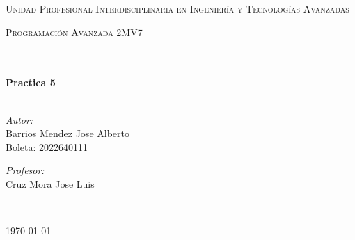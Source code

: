 \documentclass[11pt]{article}
\begin{document}
\begin{center}
\textsc{\LARGE Unidad Profesional Interdisciplinaria en Ingenier\'ia y				%
Tecnolog\'ias Avanzadas}\\[1.5cm]													%

\begin{minipage}{0.9\textwidth} 
\begin{center}																					%
\textsc{\LARGE Programación Avanzada 2MV7}
\end{center}
\end{minipage}\\[0.5cm]
 			\vspace*{1cm}																		%
\HRule \\[0.4cm]																	%
{ \huge \bfseries Practica 5}\\[0.4cm]	%
\HRule \\[1.5cm]																	%
\begin{minipage}{0.46\textwidth}													%
\begin{flushleft} \large															%
\emph{Autor:}\\	
Barrios Mendez Jose Alberto\\
Boleta: 2022640111


\end{flushleft}																		%
\end{minipage}		
\begin{minipage}{0.52\textwidth}		
\vspace{-0.6cm}											%
\begin{flushright} \large															%
\emph{Profesor:} \\																	%
Cruz Mora Jose Luis\\
\end{flushright}																	%
\end{minipage}	
\vspace*{1cm}
 	
 		\\																		%
\vspace{2cm} 																				
\begin{center}																					
{\large \today}																	%
 			\end{center}												  						
\end{center}							 											
																					
\end{document}
